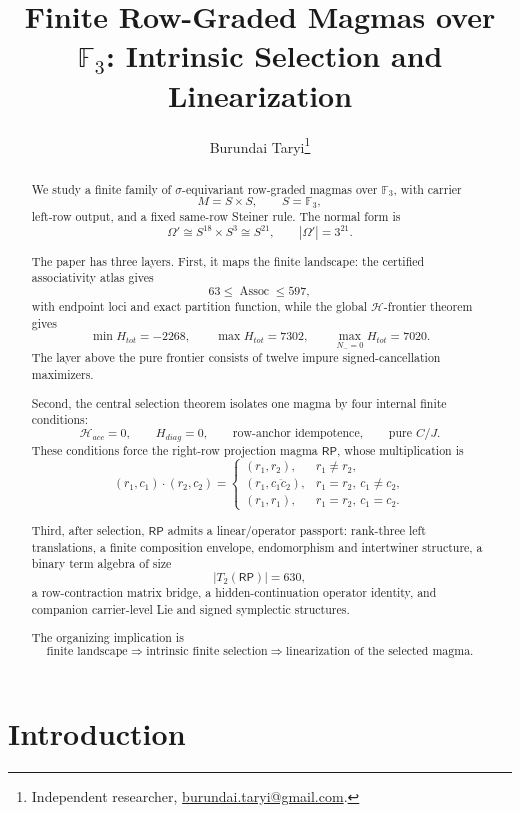 \documentclass[11pt]{article}
\title{Finite Row-Graded Magmas over \(\mathbb F_3\): Intrinsic Selection and Linearization}
\author{Burundai Taryi\thanks{Independent researcher, \href{mailto:burundai.taryi@gmail.com}{burundai.taryi@gmail.com}.}}
\date{}
\theoremstyle{definition}
\newcommand{\RP}{\mathsf{RP}}
\begin{document}
\maketitle

\begin{abstract}
We study a finite family of \(\sigma\)-equivariant row-graded magmas over \(\mathbb F_3\), with carrier \[
M=S\times S,\qquad S=\mathbb F_3,
\] left-row output, and a fixed same-row Steiner rule. The normal
form is \[
\Omega'\cong S^{18}\times S^3\cong S^{21},\qquad |\Omega'|=3^{21}.
\]

The paper has three layers. First, it maps the finite landscape: the
certified associativity atlas gives \[
63\le \operatorname{Assoc}\le 597,
\] with endpoint loci and exact partition function, while the global
\(\mathcal H\)-frontier theorem gives \[
\min H_{tot}=-2268,\qquad \max H_{tot}=7302,
\qquad \max_{N_-=0}H_{tot}=7020.
\] The layer above the pure frontier consists of twelve impure
signed-cancellation maximizers.

Second, the central selection theorem isolates one magma by four
internal finite conditions: \[
\boxed{
\mathcal H_{acc}=0,
\qquad
H_{diag}=0,
\qquad
\text{row-anchor idempotence},
\qquad
\text{pure }C/J.
}
\] These conditions force the right-row projection magma \(\RP\), whose multiplication is \[
(r_1,c_1)\cdot(r_2,c_2)=
\begin{cases}
(r_1,r_2),&r_1\ne r_2,\\[1mm]
(r_1,\overline{c_1c_2}),&r_1=r_2,
\ c_1\ne c_2,\\[1mm]
(r_1,r_1),&r_1=r_2,
\ c_1=c_2.
\end{cases}
\]

Third, after selection, \(\RP\) admits a linear/operator passport:
rank-three left translations, a finite composition envelope,
endomorphism and intertwiner structure, a binary term algebra of size \[
|T_2(\RP)|=630,
\] a row-contraction matrix bridge, a hidden-continuation operator
identity, and companion carrier-level Lie and signed symplectic
structures.

The organizing implication is \[
\boxed{\text{finite landscape}}
\Longrightarrow
\boxed{\text{intrinsic finite selection}}
\Longrightarrow
\boxed{\text{linearization of the selected magma}}.
\]
\end{abstract}

\tableofcontents
\newpage

\setcounter{section}{-1}
\section{Introduction}\label{introduction}
\end{document}
